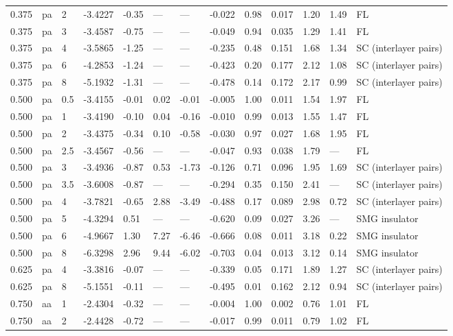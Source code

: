 \documentclass[10pt]{article}
\begin{document}
\begin{center}
{\begin{tabular}{lllllllllllll}
0.375 & pa & 2 & -3.4227 & -0.35 & --- & --- & -0.022 & 0.98 & 0.017 & 1.20 & 1.49 & FL \\
0.375 & pa & 3 & -3.4587 & -0.75 & --- & --- & -0.049 & 0.94 & 0.035 & 1.29 & 1.41 & FL \\
0.375 & pa & 4 & -3.5865 & -1.25 & --- & --- & -0.235 & 0.48 & 0.151 & 1.68 & 1.34 & SC (interlayer pairs) \\
0.375 & pa & 6 & -4.2853 & -1.24 & --- & --- & -0.423 & 0.20 & 0.177 & 2.12 & 1.08 & SC (interlayer pairs) \\
0.375 & pa & 8 & -5.1932 & -1.31 & --- & --- & -0.478 & 0.14 & 0.172 & 2.17 & 0.99 & SC (interlayer pairs) \\
0.500 & pa & 0.5 & -3.4155 & -0.01 & 0.02 & -0.01 & -0.005 & 1.00 & 0.011 & 1.54 & 1.97 & FL \\
0.500 & pa & 1 & -3.4190 & -0.10 & 0.04 & -0.16 & -0.010 & 0.99 & 0.013 & 1.55 & 1.47 & FL \\
0.500 & pa & 2 & -3.4375 & -0.34 & 0.10 & -0.58 & -0.030 & 0.97 & 0.027 & 1.68 & 1.95 & FL \\
0.500 & pa & 2.5 & -3.4567 & -0.56 & --- & --- & -0.047 & 0.93 & 0.038 & 1.79 & --- & FL \\
0.500 & pa & 3 & -3.4936 & -0.87 & 0.53 & -1.73 & -0.126 & 0.71 & 0.096 & 1.95 & 1.69 & SC (interlayer pairs) \\
0.500 & pa & 3.5 & -3.6008 & -0.87 & --- & --- & -0.294 & 0.35 & 0.150 & 2.41 & --- & SC (interlayer pairs) \\
0.500 & pa & 4 & -3.7821 & -0.65 & 2.88 & -3.49 & -0.488 & 0.17 & 0.089 & 2.98 & 0.72 & SC (interlayer pairs) \\
0.500 & pa & 5 & -4.3294 & 0.51 & --- & --- & -0.620 & 0.09 & 0.027 & 3.26 & --- & SMG insulator \\
0.500 & pa & 6 & -4.9667 & 1.30 & 7.27 & -6.46 & -0.666 & 0.08 & 0.011 & 3.18 & 0.22 & SMG insulator \\
0.500 & pa & 8 & -6.3298 & 2.96 & 9.44 & -6.02 & -0.703 & 0.04 & 0.013 & 3.12 & 0.14 & SMG insulator \\
0.625 & pa & 4 & -3.3816 & -0.07 & --- & --- & -0.339 & 0.05 & 0.171 & 1.89 & 1.27 & SC (interlayer pairs) \\
0.625 & pa & 8 & -5.1551 & -0.11 & --- & --- & -0.495 & 0.01 & 0.162 & 2.12 & 0.94 & SC (interlayer pairs) \\
0.750 & aa & 1 & -2.4304 & -0.32 & --- & --- & -0.004 & 1.00 & 0.002 & 0.76 & 1.01 & FL \\
0.750 & aa & 2 & -2.4428 & -0.72 & --- & --- & -0.017 & 0.99 & 0.011 & 0.79 & 1.02 & FL \\

\end{tabular}}
\end{center}
\end{document}
